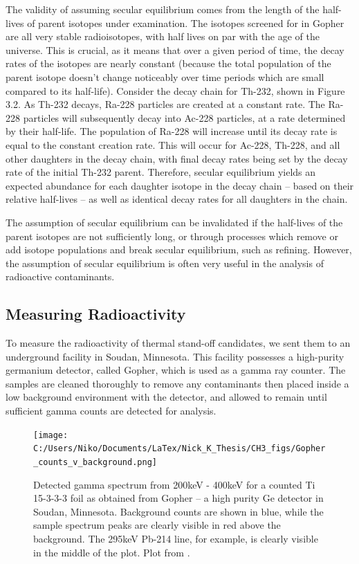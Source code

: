 \documentclass{report}
\begin{document}
The validity of assuming secular equilibrium comes from the length of the half-lives of parent isotopes under examination. The isotopes screened for in Gopher are all very stable radioisotopes, with half lives on par with the age of the universe. This is crucial, as it means that over a given period of time, the decay rates of the isotopes are nearly constant (because the total population of the parent isotope doesn't change noticeably over time periods which are small compared to its half-life). Consider the decay chain for Th-232, shown in Figure 3.2. As Th-232 decays, Ra-228 particles are created at a constant rate. The Ra-228 particles will subsequently decay into Ac-228 particles, at a rate determined by their half-life. The population of Ra-228 will increase until its decay rate is equal to the constant creation rate. This will occur for Ac-228, Th-228, and all other daughters in the decay chain, with final decay rates being set by the decay rate of the initial Th-232 parent. Therefore, secular equilibrium yields an expected abundance for each daughter isotope in the decay chain -- based on their relative half-lives -- as well as identical decay rates for all daughters in the chain.

The assumption of secular equilibrium can be invalidated if the half-lives of the parent isotopes are not sufficiently long, or through processes which remove or add isotope populations and break secular equilibrium, such as refining. However, the assumption of secular equilibrium is often very useful in the analysis of radioactive contaminants.


\subsection{Measuring Radioactivity}
To measure the radioactivity of thermal stand-off candidates, we sent them to an underground facility in Soudan, Minnesota. This facility possesses a high-purity germanium detector, called Gopher, which is used as a gamma ray counter. The samples are cleaned thoroughly to remove any contaminants then placed inside a low background environment with the detector, and allowed to remain until sufficient gamma counts are detected for analysis.

\begin{figure}
\centering
\texttt{[image: C:/Users/Niko/Documents/LaTex/Nick\_K\_Thesis/CH3\_figs/Gopher\_counts\_v\_background.png]}
\caption{Detected gamma spectrum from 200keV - 400keV for a counted Ti 15-3-3-3 foil as obtained from Gopher -- a high purity Ge detector in Soudan, Minnesota. Background counts are shown in blue, while the sample spectrum peaks are clearly visible in red above the background. The 295keV Pb-214 line, for example, is clearly visible in the middle of the plot. Plot from \cite{GopherTi15333}.}
\end{figure}
\end{document}
